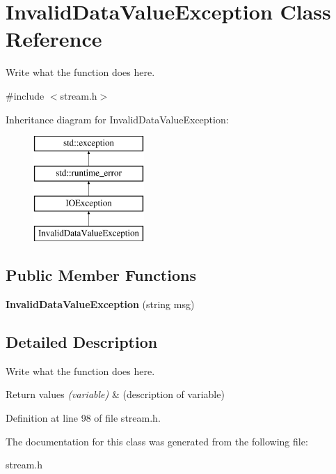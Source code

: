 \hypertarget{classInvalidDataValueException}{\section{Invalid\+Data\+Value\+Exception Class Reference}
\label{classInvalidDataValueException}
}


Write what the function does here.  




{\ttfamily \#include $<$stream.\+h$>$}

Inheritance diagram for Invalid\+Data\+Value\+Exception\+:\begin{figure}[H]
\begin{center}
\leavevmode
\includegraphics[height=4.000000cm]{classInvalidDataValueException}
\end{center}
\end{figure}
\subsection*{Public Member Functions}
\begin{DoxyCompactItemize}
\item 
\hypertarget{classInvalidDataValueException_a7f19492afda3de435899cce6c3b079ac}{{\bfseries Invalid\+Data\+Value\+Exception} (string msg)}\label{classInvalidDataValueException_a7f19492afda3de435899cce6c3b079ac}

\end{DoxyCompactItemize}


\subsection{Detailed Description}
Write what the function does here. 


\begin{DoxyRetVals}{Return values}
{\em (variable)} & (description of variable) \\
\hline
\end{DoxyRetVals}


Definition at line 98 of file stream.\+h.



The documentation for this class was generated from the following file\+:\begin{DoxyCompactItemize}
\item 
stream.\+h\end{DoxyCompactItemize}
